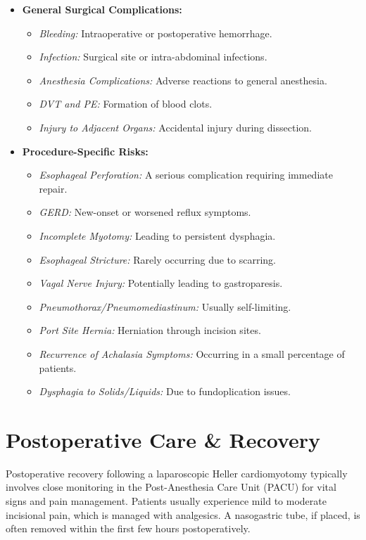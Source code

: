 \begin{itemize}
  \item \textbf{General Surgical Complications:}
    \begin{itemize}
      \item \textit{Bleeding:} Intraoperative or postoperative hemorrhage.
      \item \textit{Infection:} Surgical site or intra-abdominal infections.
      \item \textit{Anesthesia Complications:} Adverse reactions to general anesthesia.
      \item \textit{DVT and PE:} Formation of blood clots.
      \item \textit{Injury to Adjacent Organs:} Accidental injury during dissection.
    \end{itemize}
  \item \textbf{Procedure-Specific Risks:}
    \begin{itemize}
      \item \textit{Esophageal Perforation:} A serious complication requiring immediate repair.
      \item \textit{GERD:} New-onset or worsened reflux symptoms.
      \item \textit{Incomplete Myotomy:} Leading to persistent dysphagia.
      \item \textit{Esophageal Stricture:} Rarely occurring due to scarring.
      \item \textit{Vagal Nerve Injury:} Potentially leading to gastroparesis.
      \item \textit{Pneumothorax/Pneumomediastinum:} Usually self-limiting.
      \item \textit{Port Site Hernia:} Herniation through incision sites.
      \item \textit{Recurrence of Achalasia Symptoms:} Occurring in a small percentage of patients.
      \item \textit{Dysphagia to Solids/Liquids:} Due to fundoplication issues.
    \end{itemize}
\end{itemize}

\section*{Postoperative Care \& Recovery}
Postoperative recovery following a laparoscopic Heller cardiomyotomy typically involves close monitoring in the Post-Anesthesia Care Unit (PACU) for vital signs and pain management. Patients usually experience mild to moderate incisional pain, which is managed with analgesics. A nasogastric tube, if placed, is often removed within the first few hours postoperatively.

